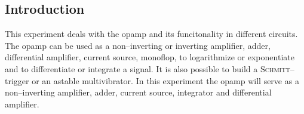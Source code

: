 \documentclass[a4paper,10pt]{article}
\numberwithin{equation}{section}
\begin{document}
\begin{multicols}{2}

        \section{Introduction}
        This experiment deals with the opamp and its funcitonality in different circuits.
        The opamp can be used as a non--inverting or inverting amplifier, adder, differential amplifier, current source, monoflop, to logarithmize or exponentiate and to differentiate or integrate a signal.
        It is also possible to build a \textsc{Schmitt}--trigger or an astable multivibrator.
        In this experiment the opamp will serve as a non--inverting amplifier, adder, current source, integrator and differential amplifier.


\end{multicols}
\end{document}
